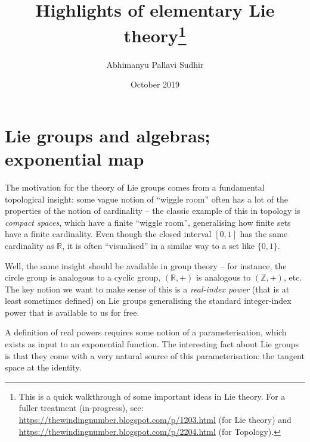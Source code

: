 \documentclass{article}
\title{Highlights of elementary Lie theory\footnote{This is a quick walkthrough of some important ideas in Lie theory. For a fuller treatment (in-progress), see: \url{https://thewindingnumber.blogspot.com/p/1203.html} (for Lie theory) and \url{https://thewindingnumber.blogspot.com/p/2204.html} (for Topology).}}
\author{Abhimanyu Pallavi Sudhir}
\date{October 2019}
\newcommand{\Real}{\mathbb{R}}
\begin{document}
\maketitle

\tableofcontents

\section{Lie groups and algebras; exponential map}

The motivation for the theory of Lie groups comes from a fundamental topological insight: some vague notion of ``wiggle room'' often has a lot of the properties of the notion of cardinality -- the classic example of this in topology is \emph{compact spaces}, which have a finite ``wiggle room'', generalising how finite sets have a finite cardinality. Even though the closed interval $[0,1]$ has the same cardinality as $\Real$, it is often ``visualised'' in a similar way to a set like $\{0,1\}$.

Well, the same insight should be available in group theory -- for instance, the circle group is analogous to a cyclic group, $(\Real,+)$ is analogous to $(\mathbb{Z},+)$, etc. The key notion we want to make sense of this is a \emph{real-index power} (that is at least sometimes defined) on Lie groups generalising the standard integer-index power that is available to us for free.

A definition of real powers requires some notion of a parameterisation, which exists as input to an exponential function. The interesting fact about Lie groups is that they come with a very natural source of this parameterisation: the tangent space at the identity. 

\vspace{15pt}
\end{document}
